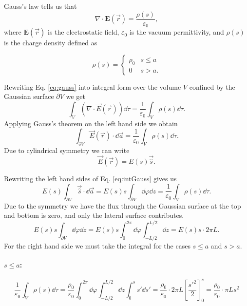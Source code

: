Gauss's law tells us that 
\begin{equation}
    \nabla \cdot \textbf{E}(\vec{r}) = \frac{\rho(s)}{\varepsilon_0},\label{eq:gauss}
\end{equation}
where $\textbf{E}(\vec{r})$ is the electrostatic field, $\varepsilon_0$ is the vacuum permittivity, and $\rho(s)$ is the charge density defined as
\begin{singlespace}
\begin{equation}
    \rho(s) = 
    \begin{cases}
        \rho_0 & s \leq a\\
        0 & s > a.
    \end{cases}
\end{equation}
\end{singlespace}
Rewriting Eq. \eqref{eq:gauss} into integral form over the volume $V$ confined by the Gaussian surface $\partial V$ we get
\begin{equation}
    \int_{V} (\nabla \cdot \vec{E}(\vec{r})) \dd \tau = \frac{1}{\varepsilon_0} \int_V  \rho(s)\dd \tau.
\end{equation}
Applying Gauss's theorem on the left hand side we obtain
\begin{equation}
    \int_{\partial V}  \vec{E}(\vec{r}) \cdot \dd \vec{a} = \frac{1}{\varepsilon_0} \int_V  \rho(s)\dd \tau.\label{eq:intGauss}
\end{equation}
Due to cylindrical symmetry we can write 
\begin{equation}
    \vec{E}(\vec{r}) = E(s) \vec{\hat{s}}.
\end{equation}


Rewriting the left hand sides of Eq. \eqref{eq:intGauss} gives us
\begin{equation}
    E(s) \int_{\partial V} \vec{\hat{s}} \cdot \dd \vec{a} = E(s)s \int_{\partial V} \dd \varphi \dd z =  \frac{1}{\varepsilon_0} \int_V  \rho(s)\dd \tau.
\end{equation}
Due to the symmetry we have the flux through the Gaussian surface at the top and bottom is zero, and only the lateral surface contributes.
\begin{equation}
    E(s)s \int_{\partial V} \dd \varphi \dd z = E(s)s \int_{0}^{2\pi}\dd\varphi \int_{-L/2}^{L/2} \dd z = E(s)s \cdot 2\pi L.
    \label{eq:LHS}
\end{equation}
For the right hand side we must take the integral for the cases $s \leq a$ and $s > a$.
\paragraph{$s \leq a$:} 
\begin{equation}
    \frac{1}{\varepsilon_0} \int_{V} \rho(s) \dd \tau = \frac{\rho_0}{\varepsilon_0} \int_{0}^{2\pi}\dd \varphi \int_{-L/2}^{L/2} \dd z \int_{0}^{s} s' \dd s' = \frac{\rho_0}{\varepsilon_0} \cdot 2\pi L \left[\frac{s'^2}{2}\right]_0^s = \frac{\rho_0}{\varepsilon_0}\cdot \pi L s^2\label{eq:RHS1}
\end{equation}
